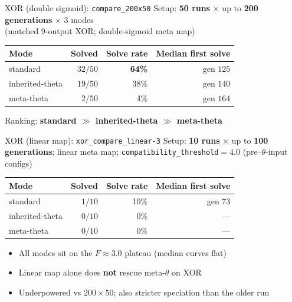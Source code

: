 \documentclass[aspectratio=169,11pt]{beamer}
\begin{document}
\begin{frame}{XOR (double sigmoid): \texttt{compare\_200x50}}
  Setup: \textbf{50 runs} $\times$ up to \textbf{200 generations} $\times$ 3 modes\\
  (matched 9-output XOR; double-sigmoid meta map)

  \vspace{0.6em}
  \begin{tabular}{lrrr}
    \toprule
    Mode & Solved & Solve rate & Median first solve \\
    \midrule
    standard & $32/50$ & \textbf{64\%} & gen $125$ \\
    inherited-theta & $19/50$ & 38\% & gen $140$ \\
    meta-theta & $2/50$ & 4\% & gen $164$ \\
    \bottomrule
  \end{tabular}

  \vspace{0.8em}
  Ranking: \textbf{standard $\gg$ inherited-theta $\gg$ meta-theta}
\end{frame}

\begin{frame}{XOR (linear map): \texttt{xor\_compare\_linear-3}}
  Setup: \textbf{10 runs} $\times$ up to \textbf{100 generations}; linear meta map;
  \texttt{compatibility\_threshold}${}=4.0$ (pre--$\theta$-input configs)

  \vspace{0.6em}
  \begin{tabular}{lrrr}
    \toprule
    Mode & Solved & Solve rate & Median first solve \\
    \midrule
    standard & $1/10$ & 10\% & gen $73$ \\
    inherited-theta & $0/10$ & 0\% & --- \\
    meta-theta & $0/10$ & 0\% & --- \\
    \bottomrule
  \end{tabular}

  \vspace{0.6em}
  \begin{itemize}
    \item All modes sit on the $F\approx 3.0$ plateau (median curves flat)
    \item Linear map alone does \textbf{not} rescue meta-$\theta$ on XOR
    \item Underpowered vs $200\times 50$; also stricter speciation than the older run
  \end{itemize}
\end{frame}
\end{document}
